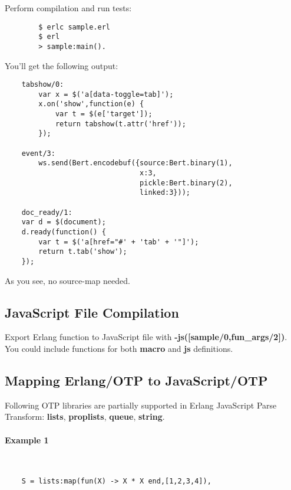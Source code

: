 Perform compilation and run tests:

\vspace{1\baselineskip}
\begin{lstlisting}
        $ erlc sample.erl
        $ erl
        > sample:main().
\end{lstlisting}
\vspace{1\baselineskip}

You'll get the following output:

\vspace{1\baselineskip}
\begin{lstlisting}
    tabshow/0:
        var x = $('a[data-toggle=tab]');
        x.on('show',function(e) {
            var t = $(e['target']);
            return tabshow(t.attr('href'));
        });

    event/3:
        ws.send(Bert.encodebuf({source:Bert.binary(1),
                                x:3,
                                pickle:Bert.binary(2),
                                linked:3}));

    doc_ready/1:
    var d = $(document);
    d.ready(function() {
        var t = $('a[href="#' + 'tab' + '"]');
        return t.tab('show');
    });
\end{lstlisting}
\vspace{1\baselineskip}

As you see, no source-map needed.

\subsection{JavaScript File Compilation}
Export Erlang function to JavaScript file with {\bf -js([sample/0,fun\_{args}/2])}.
You could include functions for both {\bf macro} and {\bf js} definitions.

\newpage
\subsection{Mapping Erlang/OTP to JavaScript/OTP}
Following OTP libraries are partially supported in Erlang JavaScript Parse Transform:
{\bf lists}, {\bf proplists}, {\bf queue}, {\bf string}.

\paragraph{\bf Example 1}\
\vspace{1\baselineskip}
\begin{lstlisting}
    S = lists:map(fun(X) -> X * X end,[1,2,3,4]),
\end{lstlisting}

